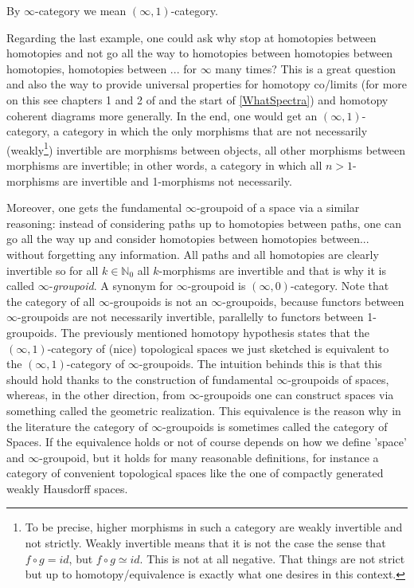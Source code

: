 \begin{notat}
    By $\infty$-category we mean $(\infty,1)$-category.
\end{notat}
\begin{ex}\label{HomotopyHypothesis} Regarding the last example, one could ask why stop at homotopies between homotopies and not go all the way to homotopies between homotopies between
     homotopies, homotopies between ... for $\infty$ many times? This is a great question and also the way
     to provide universal properties for
     homotopy co/limits (for more on this see chapters 1 and 2 of \cite{HarpazAlgebras} and 
     the start of \ref{WhatSpectra}) and 
     homotopy coherent diagrams more generally. In the end, one
     would get an $(\infty,1)$-category, a category in which the only morphisms that are not necessarily (weakly\footnote{To be precise, higher
         morphisms in such a category are weakly invertible and not strictly. Weakly invertible means
         that it is not the case the sense that $f\circ g=id$, but $f\circ g\simeq id$. This is not at all
         negative. That things are not strict but up to homotopy/equivalence is exactly what one desires in this context.}) invertible are morphisms between objects, all other morphisms between morphisms are invertible; in other words, a category in which all $n>1$-morphisms are invertible and 1-morphisms not necessarily. 
    
    Moreover, one gets the fundamental $\infty$-groupoid of a space via a similar reasoning: instead of considering paths up to homotopies between paths, one can go all the way up and consider homotopies between homotopies between... without forgetting any information. All paths and all homotopies are clearly invertible so for all $k\in \mathbb{N}_0$ all $k$-morphisms are invertible and that is why it is called $\infty$-\emph{groupoid}. A synonym for $\infty$-groupoid is $(\infty,0)$-category. Note that the category of all $\infty$-groupoids is not an $\infty$-groupoids, because functors between $\infty$-groupoids are not necessarily invertible, parallelly to functors between 1-groupoids. The previously mentioned homotopy hypothesis states that the $(\infty,1)$-category of (nice) topological spaces we just sketched is equivalent to the $(\infty,1)$-category of $\infty$-groupoids. The intuition behinds this is that this should hold thanks to the construction of fundamental $\infty$-groupoids of spaces, whereas, in the other direction, from $\infty$-groupoids one can construct spaces via something called the geometric realization. This equivalence is the reason why in the literature the category of $\infty$-groupoids is sometimes called the category of Spaces. If the equivalence holds or not of course depends on how we define 'space' and $\infty$-groupoid, but it holds for many reasonable definitions, for instance a category of convenient topological spaces like the one of compactly generated weakly Hausdorff spaces. 
    

\end{ex}
